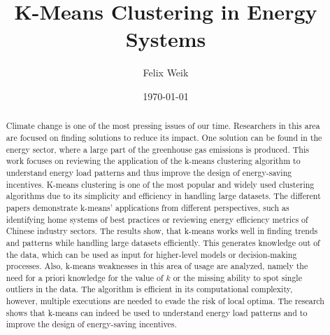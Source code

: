 \documentclass{revtex4-2}
\begin{document}
\title{K-Means Clustering in Energy Systems}
\author{Felix Weik}
\date{\today}


\begin{abstract}
Climate change is one of the most pressing issues of our time. 
Researchers in this area are focused on finding solutions to reduce its impact.
One solution can be found in the energy sector, where a large part of the greenhouse gas emissions is produced.
This work focuses on reviewing the application of the k-means clustering algorithm to understand energy load patterns and thus improve the design of energy-saving incentives.
K-means clustering is one of the most popular and widely used clustering algorithms due to its simplicity and efficiency in handling large datasets.
The different papers demonstrate k-means' applications from different perspectives, such as identifying home systems of best practices or reviewing energy efficiency metrics of Chinese industry sectors.
The results show, that k-means works well in finding trends and patterns while handling large datasets efficiently.
This generates knowledge out of the data, which can be used as input for higher-level models or decision-making processes.
Also, k-means weaknesses in this area of usage are analyzed, namely the need for a priori knowledge for the value of $k$ or the missing ability to spot single outliers in the data.
The algorithm is efficient in its computational complexity, however, multiple executions are needed to evade the risk of local optima.
The research shows that k-means can indeed be used to understand energy load patterns and to improve the design of energy-saving incentives.
\end{abstract}

\maketitle













\end{document}
